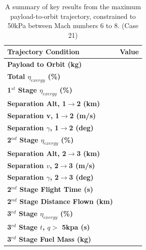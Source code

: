 	\begin{table}[!ht]%
	\centering
\begin{tabular}{l c } 
	\hline \textbf{Trajectory Condition}
	& Value

	\\
	\hline \textbf{Payload to Orbit (kg)}
	& \textbf{\PayloadToOrbitqconstrainedNoReturn}
	\\
	\textbf{Total $\eta_{exergy}$ (\%)}
	& \textbf{\totalExergyEffqconstrainedNoReturn}
	\\
	\hline 
	\textbf{1$^{st}$ Stage $\eta_{exergy}$ (\%)}
	& \textbf{\firstExergyEffqconstrainedNoReturn}
	\\
	\textbf{Separation Alt, 1$\rightarrow$2 (km)}
	& \firstsecondSeparationAltqconstrainedNoReturn
	\\
	\textbf{Separation v, 1$\rightarrow$2 (m/s)}
	& \firstsecondSeparationvqconstrainedNoReturn
	\\
	\textbf{Separation $\gamma$, 1$\rightarrow$2 (deg)}
	& \firstsecondSeparationgammaqconstrainedNoReturn
	\\
	\hline 
	\textbf{2$^{nd}$ Stage $\eta_{exergy}$ (\%)}
	& \textbf{\secondExergyEffqconstrainedNoReturn}
	\\
	\textbf{Separation Alt, 2$\rightarrow$3 (km)}
	& \secondthirdSeparationAltqconstrainedNoReturn
	\\
	\textbf{Separation $v$, 2$\rightarrow$3 (m/s)}
	& \secondthirdSeparationvqconstrainedNoReturn
	\\
	\textbf{Separation $\gamma$, 2$\rightarrow$3 (deg)}
	& \secondthirdSeparationgammaqconstrainedNoReturn
	\\
	\textbf{2$^{nd}$ Stage Flight Time (s)}
	& \secondFlightTimeqconstrainedNoReturn
	\\
	\textbf{2$^{nd}$ Stage Distance Flown (km)}
	& \SecondDistqconstrainedNoReturn
	\\
	\hline 
	\textbf{3$^{rd}$ Stage $\eta_{exergy}$ (\%)}
	& \textbf{\thirddExergyEffqconstrainedNoReturn}
	\\
	\textbf{3$^{rd}$ Stage $t$, $q >$ 5kpa (s)}
	& \thirdqOverFiveqconstrainedNoReturn
	\\
	\textbf{3$^{rd}$ Stage Fuel Mass (kg)}
	& \thirdmFuelqconstrainedNoReturn
	\\
	\hline 
\end{tabular} 
\caption{A summary of key results from the maximum payload-to-orbit trajectory, constrained to 50kPa between Mach numbers 6 to 8. (Case 21)}
\label{tab:constrained68}
	\end{table}
